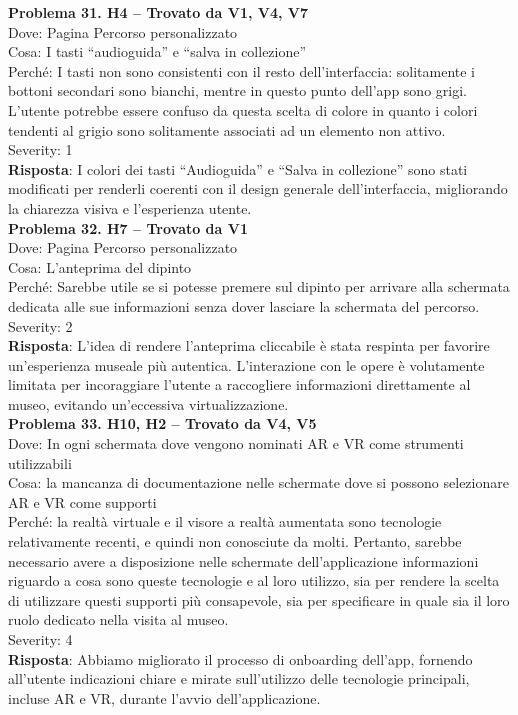 \documentclass{article}
\begin{document}
\noindent \textbf{Problema 31. H4 – Trovato da V1, V4, V7} \\
Dove: Pagina Percorso personalizzato \\
Cosa: I tasti “audioguida” e “salva in collezione” \\
Perché: I tasti non sono consistenti con il resto dell’interfaccia: solitamente i bottoni secondari sono bianchi, mentre in questo punto dell’app sono grigi. L’utente potrebbe essere confuso da questa scelta di colore in quanto i colori tendenti al grigio sono solitamente associati ad un elemento non attivo. \\
Severity: 1 \\
\textbf{Risposta}: I colori dei tasti “Audioguida” e “Salva in collezione” sono stati modificati per renderli coerenti con il design generale dell’interfaccia, migliorando la chiarezza visiva e l’esperienza utente.\\

\noindent \textbf{Problema 32. H7 – Trovato da V1} \\
Dove: Pagina Percorso personalizzato \\
Cosa: L’anteprima del dipinto \\
Perché: Sarebbe utile se si potesse premere sul dipinto per arrivare alla schermata dedicata alle sue informazioni senza dover lasciare la schermata del percorso. \\
Severity: 2 \\
\textbf{Risposta}: L’idea di rendere l’anteprima cliccabile è stata respinta per favorire un’esperienza museale più autentica. L’interazione con le opere è volutamente limitata per incoraggiare l’utente a raccogliere informazioni direttamente al museo, evitando un’eccessiva virtualizzazione.\\

\noindent \textbf{Problema 33. H10, H2 – Trovato da V4, V5} \\
Dove: In ogni schermata dove vengono nominati AR e VR come strumenti utilizzabili \\
Cosa: la mancanza di documentazione nelle schermate dove si possono selezionare AR e VR come supporti \\
Perché: la realtà virtuale e il visore a realtà aumentata sono tecnologie relativamente recenti, e quindi non conosciute da molti. Pertanto, sarebbe necessario avere a disposizione nelle schermate dell’applicazione informazioni riguardo a cosa sono queste tecnologie e al loro utilizzo, sia per rendere la scelta di utilizzare questi supporti più consapevole, sia per specificare in quale sia il loro ruolo dedicato nella visita al museo. \\
Severity: 4 \\
\textbf{Risposta}: Abbiamo migliorato il processo di onboarding dell’app, fornendo all’utente indicazioni chiare e mirate sull’utilizzo delle tecnologie principali, incluse AR e VR, durante l’avvio dell’applicazione.\\
\end{document}
